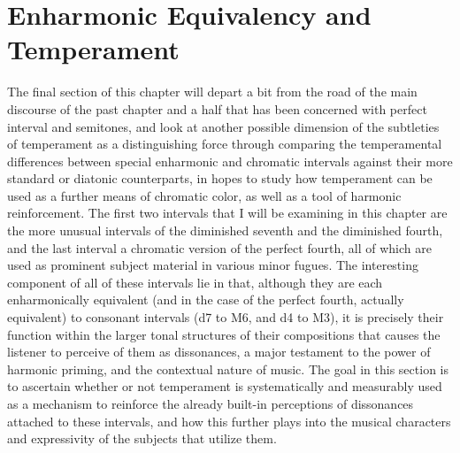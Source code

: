     \section{Enharmonic Equivalency and
Temperament}\label{enharmonic-equivalency-and-temperament}


    The final section of this chapter will depart a bit from the road of the
main discourse of the past chapter and a half that has been concerned
with perfect interval and semitones, and look at another possible
dimension of the subtleties of temperament as a distinguishing force
through comparing the temperamental differences between special
enharmonic and chromatic intervals against their more standard or
diatonic counterparts, in hopes to study how temperament can be used as
a further means of chromatic color, as well as a tool of harmonic
reinforcement. The first two intervals that I will be examining in this
chapter are the more unusual intervals of the diminished seventh and the
diminished fourth, and the last interval a chromatic version of the
perfect fourth, all of which are used as prominent subject material in
various minor fugues. The interesting component of all of these
intervals lie in that, although they are each enharmonically equivalent
(and in the case of the perfect fourth, actually equivalent) to
consonant intervals (d7 to M6, and d4 to M3), it is precisely their
function within the larger tonal structures of their compositions that
causes the listener to perceive of them as dissonances, a major
testament to the power of harmonic priming, and the contextual nature of
music. The goal in this section is to ascertain whether or not
temperament is systematically and measurably used as a mechanism to
reinforce the already built-in perceptions of dissonances attached to
these intervals, and how this further plays into the musical characters
and expressivity of the subjects that utilize them.

